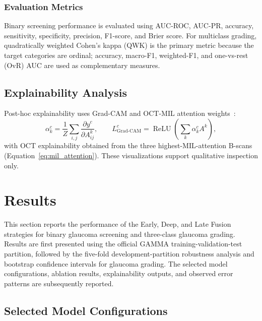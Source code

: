 \documentclass{ieeeaccess}
\begin{document}
\subsubsection{Evaluation Metrics}
\label{subsubsec:evaluation_metrics}

Binary screening performance is evaluated using AUC-ROC, AUC-PR, accuracy, sensitivity, specificity, precision, F1-score, and Brier score. For multiclass grading, quadratically weighted Cohen's kappa (QWK) is the primary metric because the target categories are ordinal; accuracy, macro-F1, weighted-F1, and one-vs-rest (OvR) AUC are used as complementary measures.

\subsection{Explainability Analysis}
\label{subsec:explainability}

Post-hoc explainability uses Grad-CAM and OCT-MIL attention weights~\cite{lai2024interpretable,bhuiyan2024interpretable}:
\begin{equation}
    \alpha_k^c=\frac{1}{Z}\sum_{i,j}\frac{\partial y^c}{\partial A_{ij}^k},\qquad
    L_{\mathrm{Grad\text{-}CAM}}^c=\operatorname{ReLU}\!\left(\sum_k \alpha_k^c A^k\right),
    \label{eq:gradcam}
\end{equation}
with OCT explainability obtained from the three highest-MIL-attention B-scans (Equation~\eqref{eq:mil_attention}). These visualizations support qualitative inspection only.



\section{Results}
\label{sec:results}

This section reports the performance of the Early, Deep, and Late Fusion strategies for binary glaucoma screening and three-class glaucoma grading. Results are first presented using the official GAMMA training-validation-test partition, followed by the five-fold development-partition robustness analysis and bootstrap confidence intervals for glaucoma grading. The selected model configurations, ablation results, explainability outputs, and observed error patterns are subsequently reported. %

\subsection{Selected Model Configurations}
\label{subsec:selected_configurations}
\end{document}
